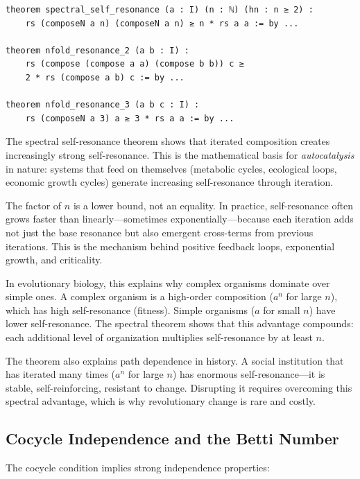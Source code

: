 \begin{lstlisting}[caption={Spectral resonance (IDT\_v3\_Emergence.lean)}]
theorem spectral_self_resonance (a : I) (n : ℕ) (hn : n ≥ 2) :
    rs (composeN a n) (composeN a n) ≥ n * rs a a := by ...
    
theorem nfold_resonance_2 (a b : I) :
    rs (compose (compose a a) (compose b b)) c ≥
    2 * rs (compose a b) c := by ...
    
theorem nfold_resonance_3 (a b c : I) :
    rs (composeN a 3) a ≥ 3 * rs a a := by ...
\end{lstlisting}

\begin{interpretation}
The spectral self-resonance theorem shows that iterated composition creates
increasingly strong self-resonance. This is the mathematical basis for
\emph{autocatalysis} in nature: systems that feed on themselves (metabolic
cycles, ecological loops, economic growth cycles) generate increasing self-resonance
through iteration.

The factor of $n$ is a lower bound, not an equality. In practice, self-resonance
often grows faster than linearly---sometimes exponentially---because each
iteration adds not just the base resonance but also emergent cross-terms from
previous iterations. This is the mechanism behind positive feedback loops,
exponential growth, and criticality.

In evolutionary biology, this explains why complex organisms dominate over simple
ones. A complex organism is a high-order composition ($a^n$ for large $n$), which
has high self-resonance (fitness). Simple organisms ($a$ for small $n$) have
lower self-resonance. The spectral theorem shows that this advantage compounds:
each additional level of organization multiplies self-resonance by at least $n$.

The theorem also explains path dependence in history. A social institution that
has iterated many times ($a^n$ for large $n$) has enormous self-resonance---it
is stable, self-reinforcing, resistant to change. Disrupting it requires
overcoming this spectral advantage, which is why revolutionary change is rare
and costly.
\end{interpretation}

\subsection{Cocycle Independence and the Betti Number}

The cocycle condition implies strong independence properties:

